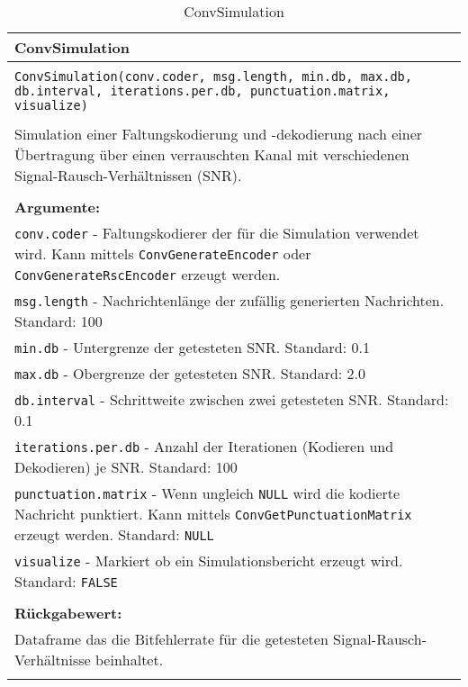 \begin{longtable}{|p{\textwidth}|}
\hline
\rowcolor{lightblue}
ConvSimulation
\\
\hline
\\
\texttt{ConvSimulation(conv.coder, msg.length, min.db, max.db, db.interval, iterations.per.db, punctuation.matrix, visualize)}\\
\\
Simulation einer Faltungskodierung und -dekodierung nach einer Übertragung über einen verrauschten Kanal mit verschiedenen Signal-Rausch-Verhältnissen (SNR).\\
\\
\textbf{Argumente:}\\
\texttt{conv.coder} - Faltungskodierer der für die Simulation verwendet wird. Kann mittels \texttt{ConvGenerateEncoder} oder \texttt{ConvGenerateRscEncoder} erzeugt werden.\\
\texttt{msg.length} - Nachrichtenlänge der zufällig generierten Nachrichten. Standard: 100\\
\texttt{min.db} - Untergrenze der getesteten SNR. Standard: 0.1\\
\texttt{max.db} - Obergrenze der getesteten SNR. Standard: 2.0\\
\texttt{db.interval} - Schrittweite zwischen zwei getesteten SNR. Standard: 0.1\\
\texttt{iterations.per.db} - Anzahl der Iterationen (Kodieren und Dekodieren) je SNR. Standard: 100\\
\texttt{punctuation.matrix} - Wenn ungleich \texttt{NULL} wird die kodierte Nachricht punktiert. Kann mittels \texttt{ConvGetPunctuationMatrix} erzeugt werden. Standard: \texttt{NULL}\\
\texttt{visualize} - Markiert ob ein Simulationsbericht erzeugt wird. Standard: \texttt{FALSE}\\
\\
\textbf{Rückgabewert:}\\
Dataframe das die Bitfehlerrate für die getesteten Signal-Rausch-Verhältnisse beinhaltet.
\\
\hline
\caption{ConvSimulation}
\end{longtable}